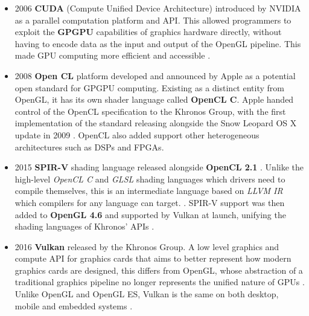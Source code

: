 \documentclass[a4paper,12pt,twoside,openright]{report}
\begin{document}
\begin{itemize}
    \item 2006 \textbf{CUDA} (Compute Unified Device Architecture) introduced
    by NVIDIA as a parallel computation platform and API. This allowed
    programmers to exploit the \textbf{GPGPU} capabilities of graphics hardware
    directly, without having to encode data as the input and output of the
    OpenGL pipeline. This made GPU computing more efficient and accessible
    \cite{AboutCUDA}.

    \item 2008 \textbf{Open CL} platform developed and announced by Apple as a
    potential open standard for GPGPU computing. Existing as a distinct entity
    from OpenGL, it has its own shader language called \textbf{OpenCL C}. Apple
    handed control of the OpenCL specification to the Khronos Group, with the
    first implementation of the standard releasing alongside the Snow Leopard
    OS X update in 2009 \cite{OpenCL}. OpenCL also added support other
    heterogeneous architectures such as DSPs and FPGAs.

    \item 2015 \textbf{SPIR-V} shading language released alongside
    \textbf{OpenCL 2.1} \cite{SPIRVLaunch}. Unlike the high-level
    \textit{OpenCL C} and \textit{GLSL} shading languages which drivers need to
    compile themselves, this is an intermediate language based on \textit{LLVM
    IR} which compilers for any language can target. \cite{LLVMIR}
    \cite{SPIRV}. SPIR-V support was then added to \textbf{OpenGL 4.6} and
    supported by Vulkan at launch, unifying the shading languages of Khronos'
    APIs \cite{SPIRVOpenGL}.

    \item 2016 \textbf{Vulkan} released by the Khronos Group. A low level
    graphics and compute API for graphics cards that aims to better represent
    how modern graphics cards are designed, this differs from OpenGL, whose
    abstraction of a traditional graphics pipeline no longer represents the
    unified nature of GPUs \cite{VulkanAnnouncement}. Unlike OpenGL and OpenGL
    ES, Vulkan is the same on both desktop, mobile and embedded systems
    \cite{Vulkan}.

\end{itemize}
\end{document}
